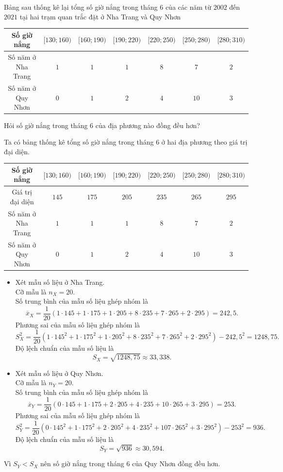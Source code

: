\begin{bt}[Mức độ 3]%
	Bảng sau thống kê lại tổng số giờ nắng trong tháng $6$ của các năm từ $2002$ đến $2021$ tại hai trạm quan trắc đặt ở Nha Trang và Quy Nhơn
	\begin{center}
		\begin{tabular}{|c|c|c|c|c|c|c|}
			\hline
			Số giờ nắng &$[130;160)$  & $[160;190)$ & $[190;220)$ & $[220;250)$ & $[250;280)$ & $[280;310)$\\
			\hline
			Số năm ở Nha Trang	& $1$ & $1$ & $1$ & $8$ & $7$ & $2$\\
			\hline
			Số năm ở Quy Nhơn & $0$ & $1$ & $2$ & $4$ & $10$ & $3$\\
			\hline
		\end{tabular}
	\end{center}
	Hỏi số giờ nắng trong tháng $6$ của địa phương nào đồng đều hơn?
	\loigiai 
	{
		Ta có bảng thống kê tổng số giờ nắng trong tháng 6 ở hai địa phương theo giá trị đại diện.
		\begin{center}
			\begin{tabular}{|c|c|c|c|c|c|c|}
				\hline
				Số giờ nắng &$[130;160)$  & $[160;190)$ & $[190;220)$ & $[220;250)$ & $[250;280)$ & $[280;310)$\\
				\hline
				Giá trị đại diện &$145$  & $175$ & $205$ & $235$ & $265$ & $295$\\
				\hline
				Số năm ở Nha Trang	& $1$ & $1$ & $1$ & $8$ & $7$ & $2$ \\
				\hline
				Số năm ở Quy Nhơn & $0$ & $1$ & $2$ & $4$ & $10$ & $3$ \\
				\hline
			\end{tabular}
		\end{center}
		\begin{itemize}
			\item Xét mẫu số liệu ở Nha Trang.\\
			Cỡ mẫu là $n_X=20$.\\
			Số trung bình của mẫu số liệu ghép nhóm là 
			$$\overline{x}_X=\dfrac{1}{20}\left(1\cdot 145+1\cdot 175+1\cdot 205+8\cdot 235+7\cdot 265+2\cdot 295\right)=242{,}5.$$
			Phương sai của mẫu số liệu ghép nhóm là
			$$S^2_X=\dfrac{1}{20}\left(1\cdot 145^2+1\cdot 175^2+1\cdot 205^2+8\cdot 235^2+7\cdot 265^2+2\cdot 295^2\right)-242{,}5^2=1248{,}75.$$
			Độ lệch chuẩn của mẫu số liệu là 
			$$S_X=\sqrt{1248{,}75}\approx 33{,}338.$$
			\item Xét mẫu số liệu ở Quy Nhơn.\\
			Cỡ mẫu là $n_Y=20$.\\
			Số trung bình của mẫu số liệu ghép nhóm là 
			$$\overline{x}_Y=\dfrac{1}{20}\left(0\cdot 145+1\cdot 175+2\cdot 205+4\cdot 235+10\cdot 265+3\cdot 295\right)=253.$$
			Phương sai của mẫu số liệu ghép nhóm là
			$$S^2_Y=\dfrac{1}{20}\left(0\cdot 145^2+1\cdot 175^2+2\cdot 205^2+4\cdot 235^2+107\cdot 265^2+3\cdot 295^2\right)-253^2=936.$$
			Độ lệch chuẩn của mẫu số liệu là 
			$$S_Y=\sqrt{936}\approx 30{,}594.$$
		\end{itemize}
		Vì $S_Y<S_X$ nên số giờ nắng trong tháng 6 của Quy Nhơn đồng đều hơn.
	}
\end{bt}
